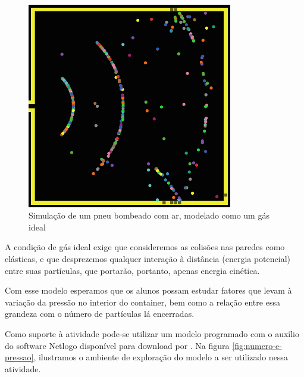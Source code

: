 \begin{figure}[!htb]
  \caption{Simulação de um pneu bombeado com ar, modelado como um gás ideal}
  \begin{center}
    \includegraphics[width=0.8\textwidth]{imagens/pneu-volume}
  \end{center}
  \label{fig:pneu-volume}
\end{figure}

A condição de gás ideal exige que consideremos as colisões nas paredes como elásticas, e que desprezemos qualquer interação à distância (energia potencial) entre suas partículas, que portarão, portanto, apenas energia cinética.

Com esse modelo esperamos que os alunos possam estudar fatores que levam à variação da pressão no interior do container, bem como a relação entre essa grandeza com o número de partículas lá encerradas.

Como suporte à atividade pode-se utilizar um modelo programado com o auxílio do software Netlogo \cite{netlogo} disponível para download por . Na figura \ref{fig:numero-e-pressao}, ilustramos o ambiente de exploração do modelo a ser utilizado nessa atividade.

